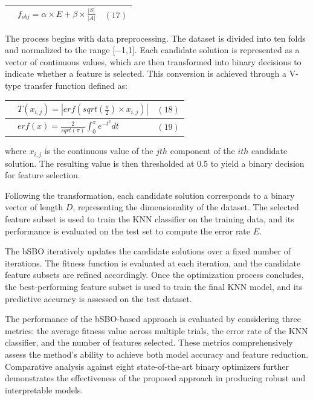 \documentclass{article} %
\begin{document}
\begin{tabular}{|p{0.4in}|p{3.1in}|p{0.4in}|} \hline 
 & $f_{obj}=α\times E+β\times \frac{\left|S\right|}{\left|A\right|}$ & $\left(\mathrm{17}\right)$ \\ \hline 
\end{tabular}



The process begins with data preprocessing. The dataset is divided into ten folds and normalized to the range [$\mathrm{-}$1,1]. Each candidate solution is represented as a vector of continuous values, which are then transformed into binary decisions to indicate whether a feature is selected. This conversion is achieved through a V-type transfer function defined as:

\begin{tabular}{|p{0.4in}|p{3.1in}|p{0.4in}|} \hline 
 & $T\left(x_{i,j}\right)=\left|erf\left(sqrt\left(\frac{π}{2}\right)\times x_{i,j}\right)\right|$ & $\left(\mathrm{18}\right)$ \\ \hline 
 & $erf\left(x\right)=\frac{2}{sqrt\left(π\right)}\int^x_0{e^{-t^2}}dt$ & $\left(\mathrm{19}\right)$ \\ \hline 
\end{tabular}

where $x_{i,j}$ is the continuous value of the $jth$ component of the $ith$ candidate solution. The resulting value is then thresholded at 0.5 to yield a binary decision for feature selection.

Following the transformation, each candidate solution corresponds to a binary vector of length $D$, representing the dimensionality of the dataset. The selected feature subset is used to train the KNN classifier on the training data, and its performance is evaluated on the test set to compute the error rate $E$.

The bSBO iteratively updates the candidate solutions over a fixed number of iterations. The fitness function is evaluated at each iteration, and the candidate feature subsets are refined accordingly. Once the optimization process concludes, the best-performing feature subset is used to train the final KNN model, and its predictive accuracy is assessed on the test dataset.

The performance of the bSBO-based approach is evaluated by considering three metrics: the average fitness value across multiple trials, the error rate of the KNN classifier, and the number of features selected. These metrics comprehensively assess the method's ability to achieve both model accuracy and feature reduction. Comparative analysis against eight state-of-the-art binary optimizers further demonstrates the effectiveness of the proposed approach in producing robust and interpretable models.
\end{document}
